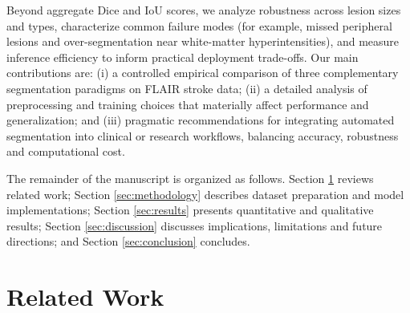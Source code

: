 \documentclass[12pt]{article}
\begin{document}
Beyond aggregate Dice and IoU scores, we analyze robustness across lesion sizes and types, characterize common failure modes (for example, missed peripheral lesions and over-segmentation near white-matter hyperintensities), and measure inference efficiency to inform practical deployment trade-offs. Our main contributions are: (i) a controlled empirical comparison of three complementary segmentation paradigms on FLAIR stroke data; (ii) a detailed analysis of preprocessing and training choices that materially affect performance and generalization; and (iii) pragmatic recommendations for integrating automated segmentation into clinical or research workflows, balancing accuracy, robustness and computational cost.

The remainder of the manuscript is organized as follows. Section \ref{sec:relatedwork} reviews related work; Section \ref{sec:methodology} describes dataset preparation and model implementations; Section \ref{sec:results} presents quantitative and qualitative results; Section \ref{sec:discussion} discusses implications, limitations and future directions; and Section \ref{sec:conclusion} concludes.

\section{Related Work} \label{sec:relatedwork}
\end{document}
